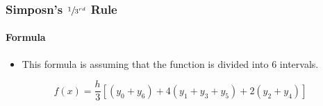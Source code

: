 \subsubsection{Simposn's $\sfrac{1}{3^{rd}}$ Rule}


\paragraph{Formula}
\begin{itemize}
    \item This formula is assuming that the function is divided into $6$ intervals.
\end{itemize}
\[ f(x) = \frac{h}{3}[(y_0 + y_6) + 4( y_1 + y_3 + y_5 ) + 2(y_2 + y_4)] \]